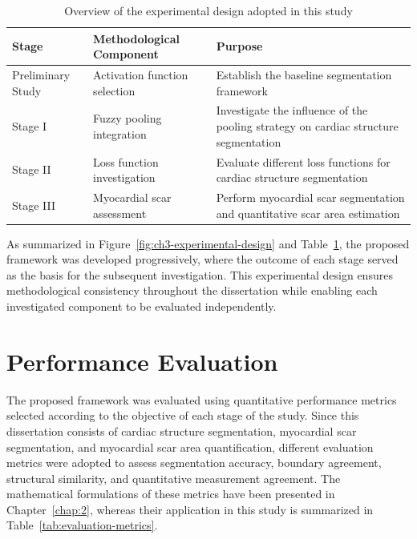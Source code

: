 \begin{table}[htbp]
\centering
\caption{Overview of the experimental design adopted in this study}
\label{tab:experimental-design}
\begin{tabularx}{\textwidth}{
		>{\raggedright\arraybackslash}p{}
		>{\raggedright\arraybackslash}p{}
		>{\raggedright\arraybackslash}X
	}
	\toprule
	\textbf{Stage} & \textbf{Methodological Component} & \textbf{Purpose} \\
	\midrule
	Preliminary Study & Activation function selection & Establish the baseline segmentation framework \\
	Stage I & Fuzzy pooling integration & Investigate the influence of the pooling strategy on cardiac structure segmentation \\
	Stage II & Loss function investigation & Evaluate different loss functions for cardiac structure segmentation \\
	Stage III & Myocardial scar assessment & Perform myocardial scar segmentation and quantitative scar area estimation \\
	\bottomrule
\end{tabularx}
\end{table}

As summarized in Figure~\ref{fig:ch3-experimental-design} and Table~\ref{tab:experimental-design}, the proposed framework was developed progressively, where the outcome of each stage served as the basis for the subsequent investigation. This experimental design ensures methodological consistency throughout the dissertation while enabling each investigated component to be evaluated independently.

\section{Performance Evaluation}
\label{sec:performance-evaluation}

The proposed framework was evaluated using quantitative performance metrics selected according to the objective of each stage of the study. Since this dissertation consists of cardiac structure segmentation, myocardial scar segmentation, and myocardial scar area quantification, different evaluation metrics were adopted to assess segmentation accuracy, boundary agreement, structural similarity, and quantitative measurement agreement. The mathematical formulations of these metrics have been presented in Chapter~\ref{chap:2}, whereas their application in this study is summarized in Table~\ref{tab:evaluation-metrics}.


